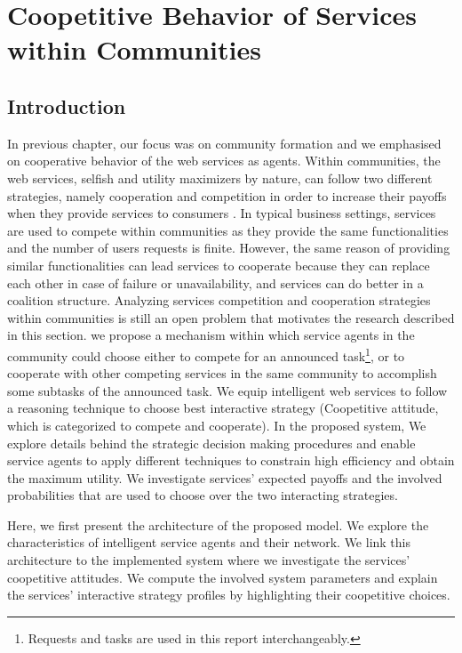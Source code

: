 \setcounter{chapter}{4}

\chapter{Coopetitive Behavior of Services within Communities}\label{cha:PCTLKC}


\section{Introduction}

In previous chapter, our focus was on community formation and we emphasised on cooperative behavior of the web services as agents. Within communities, the web services, selfish and utility maximizers by nature, can follow two different strategies, namely cooperation and competition in order to increase their payoffs when they provide services to consumers \cite{VuFind-10008938119}. In typical business settings, services are used to compete within communities as they provide the same functionalities and the number of users requests is finite. However, the same reason of providing similar functionalities can lead services to cooperate because they can replace each other in case of failure or unavailability, and services can do better in a coalition structure. Analyzing services competition and cooperation strategies within communities is still an open problem that motivates the research described in this section. we propose a mechanism within which service agents
in the community could choose either to compete for an announced task\footnote{Requests and tasks are used in this report interchangeably.}, or to cooperate with other competing services in the same community to accomplish some subtasks of the announced task. We equip intelligent web services to follow a reasoning technique to choose best interactive strategy (Coopetitive attitude, which is categorized to compete and cooperate). In the proposed system, We explore details behind the strategic decision making procedures and enable service agents to apply different techniques to constrain high efficiency and obtain the maximum utility. We investigate services' expected payoffs and the involved probabilities that are used to choose over the two interacting strategies.



Here, we first present the architecture of the proposed
model. We explore the characteristics of intelligent service
agents and their network. We link this architecture to the
implemented system where we investigate the services' coopetitive
attitudes. We compute the involved system parameters and explain
the services' interactive strategy profiles by highlighting their
coopetitive choices.



